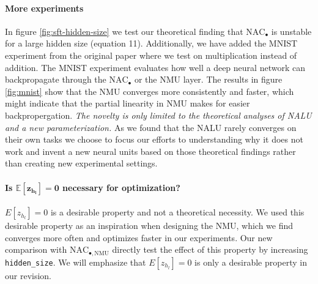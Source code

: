 \documentclass{article}
\begin{document}
\vspace{-0.5cm} \paragraph{More experiments} In figure \ref{fig:sft-hidden-size} we test our theoretical finding that $\mathrm{NAC}_{\bullet}$ is unstable for a large hidden size (equation 11).
Additionally, we have added the MNIST experiment from the original paper where we test on multiplication instead of addition.
The MNIST experiment evaluates how well a deep neural network can backpropagate through the $\mathrm{NAC}_{\bullet}$ or the NMU layer.
The results in figure \ref{fig:mnist} show that the NMU converges more consistently and faster, which might indicate that the partial linearity in NMU makes for easier backpropergation. \textit{The novelty is only limited to the theoretical analyses of NALU and a new parameterization.} As we found that the NALU rarely converges on their own tasks we choose to focus our efforts to understanding why it does not work and invent a new neural units based on those theoretical findings rather than creating new experimental settings.

\vspace{-0.3cm} \paragraph{Is $\bm{\mathbb{E}[z_{h_l}] = 0}$ necessary for optimization?} $E[z_{h_l}] = 0$ is a desirable property and not a theoretical necessity.
We used this desirable property as an inspiration when designing the NMU, which we find converges more often and optimizes faster in our experiments.
Our new comparison with $\mathrm{NAC}_{\bullet, \mathrm{NMU}}$ directly test the effect of this property by increasing \texttt{hidden\_size}.
We will emphasize that $E[z_{h_l}] = 0$ is only a desirable property in our revision.
\end{document}
